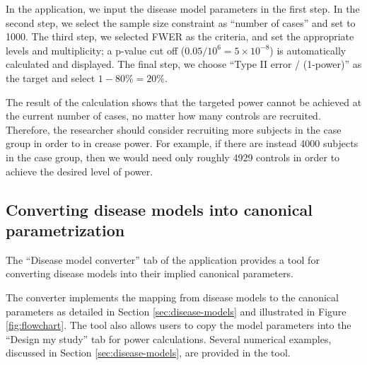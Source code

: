 In the application, we input the disease model parameters in the first step.
In the second step, we select the sample size constraint as ``number of cases'' and set to 1000.
The third step, we selected FWER as the criteria, and set the appropriate levels and multiplicity; a p-value cut off ($0.05/10^6=5\times10^{-8}$) is automatically calculated and displayed.
The final step, we choose ``Type II error / (1-power)'' as the target and select $1-80\%=20\%$.

The result of the calculation shows that the targeted power cannot be achieved at the current number of cases, no matter how many controls are recruited.
Therefore, the researcher should consider recruiting more subjects in the case group in order to in crease power.
For example, if there are instead 4000 subjects in the case group, then we would need only roughly 4929 controls in order to achieve the desired level of power.


\subsection{Converting disease models into canonical parametrization}

The ``Disease model converter'' tab of the application provides a tool for converting disease models into their implied canonical parameters.

The converter implements the mapping from disease models to the canonical parameters as detailed in Section \ref{sec:disease-models} and  illustrated in Figure \ref{fig:flowchart}.
The tool also allows users to copy the model parameters into the ``Design my study'' tab for power calculations.
Several numerical examples, discussed in Section  \ref{sec:disease-models}, are provided in the tool. 

